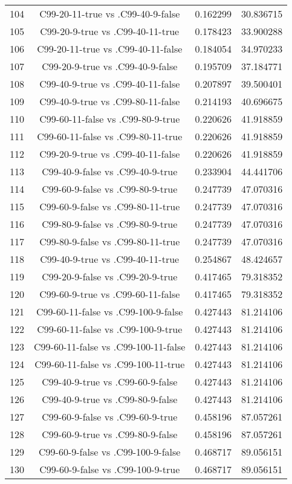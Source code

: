 \documentclass[a4paper,10pt]{article}
\begin{document}
\begin{landscape}
\begin{table}[!htp]
\begin{tabular}{cccc}
104&C99-20-11-true vs .C99-40-9-false&0.162299&30.836715\\
105&C99-20-9-true vs .C99-40-11-true&0.178423&33.900288\\
106&C99-20-11-true vs .C99-40-11-false&0.184054&34.970233\\
107&C99-20-9-true vs .C99-40-9-false&0.195709&37.184771\\
108&C99-40-9-true vs .C99-40-11-false&0.207897&39.500401\\
109&C99-40-9-true vs .C99-80-11-false&0.214193&40.696675\\
110&C99-60-11-false vs .C99-80-9-true&0.220626&41.918859\\
111&C99-60-11-false vs .C99-80-11-true&0.220626&41.918859\\
112&C99-20-9-true vs .C99-40-11-false&0.220626&41.918859\\
113&C99-40-9-false vs .C99-40-9-true&0.233904&44.441706\\
114&C99-60-9-false vs .C99-80-9-true&0.247739&47.070316\\
115&C99-60-9-false vs .C99-80-11-true&0.247739&47.070316\\
116&C99-80-9-false vs .C99-80-9-true&0.247739&47.070316\\
117&C99-80-9-false vs .C99-80-11-true&0.247739&47.070316\\
118&C99-40-9-true vs .C99-40-11-true&0.254867&48.424657\\
119&C99-20-9-false vs .C99-20-9-true&0.417465&79.318352\\
120&C99-60-9-true vs .C99-60-11-false&0.417465&79.318352\\
121&C99-60-11-false vs .C99-100-9-false&0.427443&81.214106\\
122&C99-60-11-false vs .C99-100-9-true&0.427443&81.214106\\
123&C99-60-11-false vs .C99-100-11-false&0.427443&81.214106\\
124&C99-60-11-false vs .C99-100-11-true&0.427443&81.214106\\
125&C99-40-9-true vs .C99-60-9-false&0.427443&81.214106\\
126&C99-40-9-true vs .C99-80-9-false&0.427443&81.214106\\
127&C99-60-9-false vs .C99-60-9-true&0.458196&87.057261\\
128&C99-60-9-true vs .C99-80-9-false&0.458196&87.057261\\
129&C99-60-9-false vs .C99-100-9-false&0.468717&89.056151\\
130&C99-60-9-false vs .C99-100-9-true&0.468717&89.056151\\

\end{tabular}
\end{table}
\end{landscape}
\end{document}
